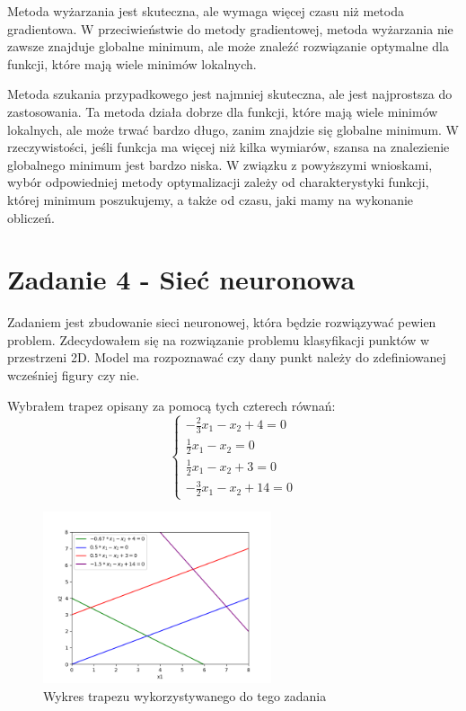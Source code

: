 \documentclass{article}
\begin{document}
Metoda wyżarzania jest skuteczna, ale wymaga więcej czasu niż metoda 
gradientowa. W przeciwieństwie do metody gradientowej, metoda 
wyżarzania nie zawsze znajduje globalne minimum, ale może znaleźć 
rozwiązanie optymalne dla funkcji, które mają wiele minimów lokalnych. 

Metoda szukania przypadkowego jest najmniej skuteczna, ale jest najprostsza do 
zastosowania. Ta metoda działa dobrze dla funkcji, które mają wiele 
minimów lokalnych, ale może trwać bardzo długo, zanim znajdzie się 
globalne minimum. W rzeczywistości, jeśli funkcja ma więcej niż 
kilka wymiarów, szansa na znalezienie globalnego minimum jest bardzo niska.
W związku z powyższymi wnioskami, wybór odpowiedniej metody optymalizacji 
zależy od charakterystyki funkcji, której minimum poszukujemy, 
a także od czasu, jaki mamy na wykonanie obliczeń. 

\section{Zadanie 4 - Sieć neuronowa}

Zadaniem jest zbudowanie sieci neuronowej, która będzie rozwiązywać
pewien problem. Zdecydowałem się na rozwiązanie problemu klasyfikacji
punktów w przestrzeni 2D. Model ma rozpoznawać czy dany punkt należy
do zdefiniowanej wcześniej figury czy nie.

Wybrałem trapez opisany za pomocą tych czterech równań:
\begin{equation}
    \begin{cases}
        -\frac{2}{3}x_1 - x_2 + 4 = 0 \\
        \frac{1}{2}x_1 - x_2 = 0 \\
        \frac{1}{2}x_1 - x_2 + 3 = 0 \\
        -\frac{3}{2}x_1 - x_2 + 14 = 0
    \end{cases}
\end{equation}
\begin{figure}[H]
    \centering
    \includegraphics[width=0.6\textwidth]{Zad4/trapez.png}
    \caption{Wykres trapezu wykorzystywanego do tego zadania}
\end{figure}
\end{document}
